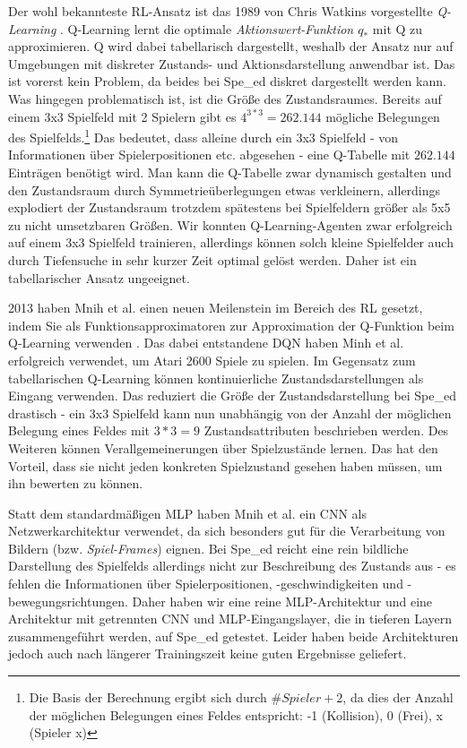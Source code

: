 Der wohl bekannteste \acrshort{RL}-Ansatz ist das 1989 von Chris Watkins vorgestellte \textit{Q-Learning} \cite{Watkins.1992}. Q-Learning lernt die optimale \textit{Aktionswert-Funktion $q_*$} mit Q zu approximieren. Q wird dabei tabellarisch dargestellt, weshalb der Ansatz nur auf Umgebungen mit diskreter Zustands- und Aktionsdarstellung anwendbar ist. Das ist vorerst kein Problem, da beides bei Spe\_ed diskret dargestellt werden kann. Was hingegen problematisch ist, ist die Größe des Zustandsraumes. Bereits auf einem 3x3 Spielfeld mit 2 Spielern gibt es $4^{3*3}=262.144$ mögliche Belegungen des Spielfelds.\footnote{Die Basis der Berechnung ergibt sich durch $\# Spieler + 2$, da dies der Anzahl der möglichen Belegungen eines Feldes entspricht: -1 (Kollision), 0 (Frei), x (Spieler x)} Das bedeutet, dass alleine durch ein 3x3 Spielfeld - von Informationen über Spielerpositionen etc. abgesehen - eine Q-Tabelle mit $262.144$ Einträgen benötigt wird. Man kann die Q-Tabelle zwar dynamisch gestalten und den Zustandsraum durch Symmetrieüberlegungen etwas verkleinern, allerdings explodiert der Zustandsraum trotzdem spätestens bei Spielfeldern größer als 5x5 zu nicht umsetzbaren Größen. Wir konnten Q-Learning-Agenten zwar erfolgreich auf einem 3x3 Spielfeld trainieren, allerdings können solch kleine Spielfelder auch durch Tiefensuche in sehr kurzer Zeit optimal gelöst werden. Daher ist ein tabellarischer Ansatz ungeeignet.

2013 haben Mnih et al. einen neuen Meilenstein im Bereich des \acrshort{RL} gesetzt, indem Sie  als Funktionsapproximatoren zur Approximation der Q-Funktion beim Q-Learning verwenden \cite{Mnih.19.12.2013, Mnih.2015}. Das dabei entstandene \acrfull{DQN} haben Minh et al. erfolgreich verwendet, um Atari 2600 Spiele zu spielen. Im Gegensatz zum tabellarischen Q-Learning können  kontinuierliche Zustandsdarstellungen als Eingang verwenden. Das reduziert die Größe der Zustandsdarstellung bei Spe\_ed drastisch - ein 3x3 Spielfeld kann nun unabhängig von der Anzahl der möglichen Belegung eines Feldes mit $3*3=9$ Zustandsattributen beschrieben werden. Des Weiteren können  Verallgemeinerungen über Spielzustände lernen. Das hat den Vorteil, dass sie nicht jeden konkreten Spielzustand gesehen haben müssen, um ihn bewerten zu können.

Statt dem standardmäßigen \acrfull{MLP} haben Mnih et al. ein \acrfull{CNN} als Netzwerkarchitektur verwendet, da sich  besonders gut für die Verarbeitung von Bildern (bzw. \textit{Spiel-Frames}) eignen. Bei Spe\_ed reicht eine rein bildliche Darstellung des Spielfelds allerdings nicht zur Beschreibung des Zustands aus - es fehlen die Informationen über Spielerpositionen, -geschwindigkeiten und -bewegungsrichtungen. Daher haben wir eine reine \acrshort{MLP}-Architektur und eine Architektur mit getrennten \acrshort{CNN} und \acrshort{MLP}-Eingangslayer, die in tieferen Layern zusammengeführt werden, auf Spe\_ed getestet. Leider haben beide Architekturen jedoch auch nach längerer Trainingszeit keine guten Ergebnisse geliefert.

